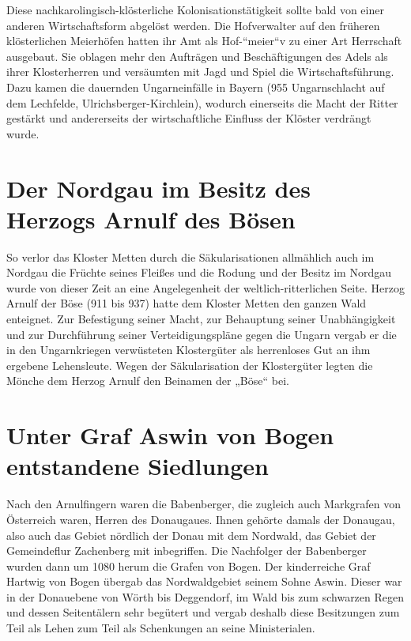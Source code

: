 \documentclass{book}
\begin{document}
Diese nachkarolingisch-klösterliche Kolonisationstätigkeit sollte bald von einer
anderen Wirtschaftsform abgelöst werden. Die Hofverwalter auf den früheren
klösterlichen Meierhöfen hatten ihr Amt als Hof-“meier“v zu einer Art Herrschaft
ausgebaut. Sie oblagen mehr den Aufträgen und Beschäftigungen des Adels als
ihrer Klosterherren und versäumten mit Jagd und Spiel die Wirtschaftsführung.
Dazu kamen die dauernden Ungarneinfälle in Bayern (955 Ungarnschlacht auf dem
Lechfelde, Ulrichsberger-Kirchlein), wodurch einerseits die Macht der Ritter
gestärkt und andererseits der wirtschaftliche Einfluss der Klöster verdrängt
wurde.

\section{Der Nordgau im Besitz des Herzogs Arnulf des Bösen}

So verlor das Kloster Metten durch die Säkularisationen allmählich auch im
Nordgau die Früchte seines Fleißes und die Rodung und der Besitz im Nordgau
wurde von dieser Zeit an eine Angelegenheit der weltlich-ritterlichen Seite.
Herzog Arnulf der Böse (911 bis 937) hatte dem Kloster Metten den ganzen Wald
enteignet. Zur Befestigung seiner Macht, zur Behauptung seiner Unabhängigkeit
und zur Durchführung seiner Verteidigungspläne gegen die Ungarn vergab er die in
den Ungarnkriegen verwüsteten Klostergüter als herrenloses Gut an ihm ergebene
Lehensleute. Wegen der Säkularisation der Klostergüter legten die Mönche dem
Herzog Arnulf den Beinamen der „Böse“ bei.

\section{Unter Graf Aswin von Bogen entstandene Siedlungen}

Nach den Arnulfingern waren die Babenberger, die zugleich auch Markgrafen von
Österreich waren, Herren des Donaugaues. Ihnen gehörte damals der Donaugau, also
auch das Gebiet nördlich der Donau mit dem Nordwald, das Gebiet der Gemeindeflur
Zachenberg mit inbegriffen. Die Nachfolger der Babenberger wurden dann um 1080
herum die Grafen von Bogen. Der kinderreiche Graf Hartwig von Bogen übergab das
Nordwaldgebiet seinem Sohne Aswin. Dieser war in der Donauebene von Wörth bis
Deggendorf, im Wald bis zum schwarzen Regen und dessen Seitentälern sehr
begütert und vergab deshalb diese Besitzungen zum Teil als Lehen zum Teil als
Schenkungen an seine Ministerialen.
\end{document}
